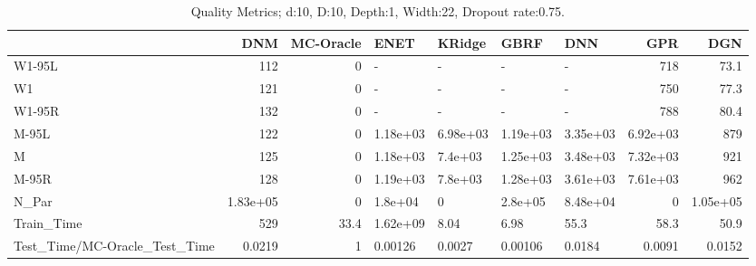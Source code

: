 \begin{table}
\centering
\caption{Quality Metrics; d:10, D:10, Depth:1, Width:22, Dropout rate:0.75.}
\begin{tabular}{lrrllllrr}
\toprule
{} &      DNM &  MC-Oracle &     ENET &   KRidge &     GBRF &      DNN &      GPR &      DGN \\
\midrule
W1-95L                        &      112 &          0 &        - &        - &        - &        - &      718 &     73.1 \\
W1                            &      121 &          0 &        - &        - &        - &        - &      750 &     77.3 \\
W1-95R                        &      132 &          0 &        - &        - &        - &        - &      788 &     80.4 \\
M-95L                         &      122 &          0 & 1.18e+03 & 6.98e+03 & 1.19e+03 & 3.35e+03 & 6.92e+03 &      879 \\
M                             &      125 &          0 & 1.18e+03 &  7.4e+03 & 1.25e+03 & 3.48e+03 & 7.32e+03 &      921 \\
M-95R                         &      128 &          0 & 1.19e+03 &  7.8e+03 & 1.28e+03 & 3.61e+03 & 7.61e+03 &      962 \\
N\_Par                         & 1.83e+05 &          0 &  1.8e+04 &        0 &  2.8e+05 & 8.48e+04 &        0 & 1.05e+05 \\
Train\_Time                    &      529 &       33.4 & 1.62e+09 &     8.04 &     6.98 &     55.3 &     58.3 &     50.9 \\
Test\_Time/MC-Oracle\_Test\_Time &   0.0219 &          1 &  0.00126 &   0.0027 &  0.00106 &   0.0184 &   0.0091 &   0.0152 \\
\bottomrule
\end{tabular}
\end{table}
